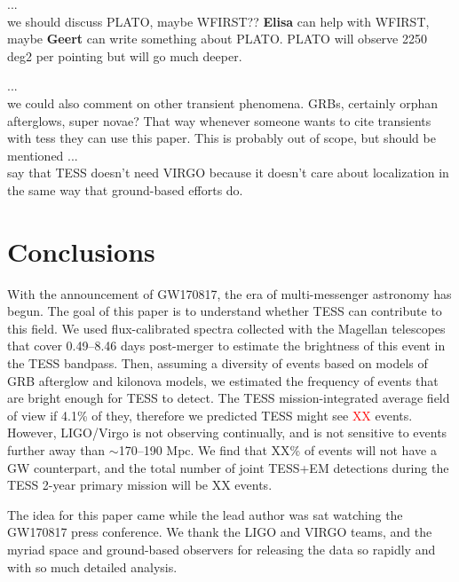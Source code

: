 \documentclass[modern]{aastex61}
\newcommand{\red}[1]{\textcolor{red}{#1}}
\begin{document}
...\\
we should discuss PLATO, maybe WFIRST?? \textbf{Elisa} can help with WFIRST, maybe \textbf{Geert} can write something about PLATO. PLATO will observe 2250 deg2 per pointing but will go much deeper.

...\\
we could also comment on other transient phenomena. GRBs, certainly orphan afterglows, super novae? That way whenever someone wants to cite transients with tess they can use this paper. This is probably out of scope, but should be mentioned
...\\
say that TESS doesn't need VIRGO because it doesn't care about localization in the same way that ground-based efforts do.

\section{Conclusions}
With the announcement of GW170817, the era of multi-messenger astronomy has begun. The goal of this paper is to understand whether TESS can contribute to this field. We used flux-calibrated spectra collected with the Magellan telescopes that cover 0.49--8.46 days post-merger to estimate the brightness of this event in the TESS bandpass. Then, assuming a diversity of events based on models of GRB afterglow and kilonova models, we estimated the frequency of events that are bright enough for TESS to detect. The TESS mission-integrated average field of view if 4.1\% of they, therefore we predicted TESS might see \red{XX} events. However, LIGO/Virgo is not observing continually, and is not sensitive to events further away than $\sim$170--190 Mpc. We find that XX\% of events will not have a GW counterpart, and the total number of joint TESS+EM detections during the TESS 2-year primary mission will be XX events. 



\acknowledgments

The idea for this paper came while the lead author was sat watching the GW170817 press conference. We thank the LIGO and VIRGO teams, and the myriad space and ground-based observers for releasing the data so rapidly and with so much detailed analysis.





{}

\end{document}
